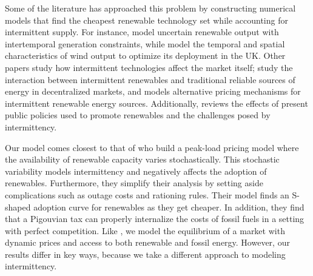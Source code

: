 \documentclass[11pt,a4paper,leqno]{extarticle}
\begin{document}
	Some of the literature has approached this problem by constructing numerical models that find the cheapest renewable technology set while accounting for intermittent supply. For instance, \citet{MN2006} model uncertain renewable output with intertemporal generation constraints, while \citet{NCK2007} model the temporal and spatial characteristics of wind output to optimize its deployment in the UK. Other papers study how intermittent technologies affect the market itself; \citet{AC2012} study the interaction between intermittent renewables and traditional reliable sources of energy in decentralized markets, and \citet{Chao2011} models alternative pricing mechanisms for intermittent renewable energy sources. Additionally, \citet{Boren2012} reviews the effects of present public policies used to promote renewables and the challenges posed by intermittency. 
	
	Our model comes closest to that of \citet{HH} who build a peak-load pricing model where the availability of renewable capacity varies stochastically. This stochastic variability models intermittency and negatively affects the adoption of renewables. Furthermore, they simplify their analysis by setting aside complications such as  outage costs and rationing rules. Their model finds an S-shaped adoption curve for renewables as they get cheaper. In addition, they find that a Pigouvian tax can properly internalize the costs of fossil fuels in a setting with perfect competition. Like \citeauthor{HH}, we model the  equilibrium of a market with dynamic prices and access to both renewable and fossil energy. However, our results differ in key ways, because we take a different approach to modeling intermittency. 
	
\end{document}

